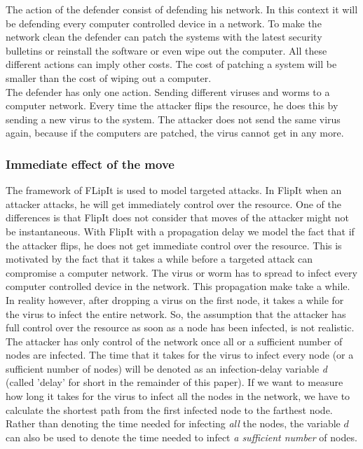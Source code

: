 The action of the defender consist of defending his network. In this context it will be defending every computer controlled device in a network. To make the network clean the defender can patch the systems with the latest security bulletins or reinstall the software or even wipe out the computer. All these different actions can imply other costs. The cost of patching a system will be smaller than the cost of wiping out a computer. \\
The defender has only one action. Sending different viruses and worms to a computer network. Every time the attacker flips the resource, he does this by sending a new virus to the system. The attacker does not send the same virus again, because if the computers are patched, the virus cannot get in any more. 
\subsubsection{Immediate effect of the move}
The framework of FLipIt is used to model targeted attacks. In FlipIt when an attacker attacks, he will get immediately control over the resource. One of the differences is that FlipIt does not consider that moves of the attacker might not be instantaneous. With FlipIt with a propagation delay we model the fact that if the attacker flips, he does not get immediate control over the resource.  This is motivated by the fact that it takes a while before a targeted attack can compromise a computer network. The virus or worm has to spread to infect every computer controlled device in the network. This propagation make take a while. \\
In reality however, after dropping a virus on the first node, it takes a while for the virus to infect
the entire network. So, the assumption that the attacker has full control over the resource as soon as a node has been infected, is not realistic. The attacker has only control of the network once all or a sufficient number of nodes are infected. 
The time that it takes for the virus to infect every node (or a sufficient number of nodes) will be
denoted as an infection-delay variable \textit{d} (called 'delay' for short in the remainder of this paper). If we want to measure how long it takes for the virus to
infect all the nodes in the network, we have to calculate the shortest path from the
first infected node to the farthest node. Rather than denoting the time needed for infecting \textit{all} the nodes, the variable $d$ can also be used to denote the time needed to infect \textit{a sufficient number} of nodes. \\

